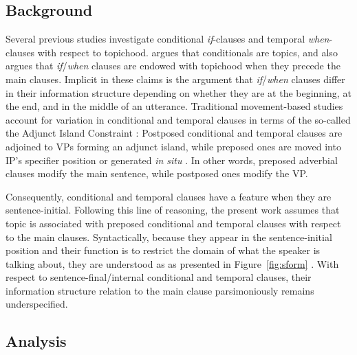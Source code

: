\subsection{Background} 
\label{10:ssec:adjunct:background}



Several previous studies investigate conditional \textit{if}-clauses
and temporal \textit{when}-clauses with respect to topichood.
\citet{haiman:78} argues that conditionals are topics, and
\citet{ramsay:87} also argues that \textit{if}/\textit{when} clauses
are endowed with topichood when they precede the main clauses.
Implicit in these claims is the argument that
\textit{if}/\textit{when} clauses differ in their information
structure depending on whether they are at the beginning, at the end,
and in the middle of an utterance.  Traditional movement-based studies
account for variation in conditional and temporal clauses in terms of
the so-called the Adjunct Island Constraint \citep{huang:82}:
Postposed conditional and temporal clauses are adjoined to VPs forming
an adjunct island, while preposed ones are moved into IP's specifier
position \citep{iatridou:91} or generated \textit{in situ}
\citep{taylor:07}.  In other words, preposed adverbial clauses modify
the main sentence, while postposed ones modify the VP.



Consequently, conditional and temporal clauses have a  feature
when they are sentence-initial.  Following this line of reasoning, the
present work assumes that topic is associated with preposed
conditional and temporal clauses with respect to the main
clauses. Syntactically, because they appear in the sentence-initial
position and their function is to restrict the domain of what the
speaker is talking about, they are understood as 
as presented in
Figure~\ref{fig:sform} . With
respect to sentence-final/internal conditional and temporal clauses,
their information structure relation to the main clause parsimoniously
remains underspecified.



\subsection{Analysis}
\label{10:ssec:adjunct:analysis}

